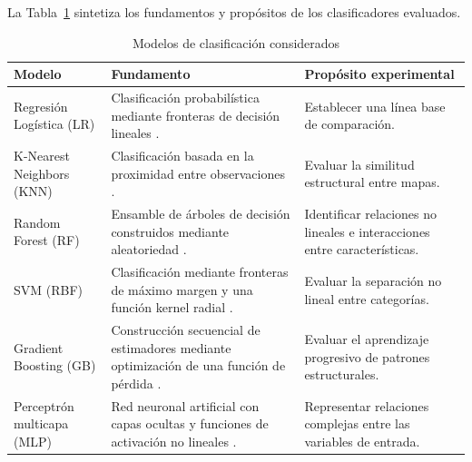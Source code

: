 La Tabla~\ref{tab:modelos_considerados} sintetiza los fundamentos y propósitos de los clasificadores evaluados.

\begin{table}[htbp]
	\centering
	
	\caption{Modelos de clasificación considerados}
	\label{tab:modelos_considerados}
	
	\renewcommand{\arraystretch}{1.3}
	\small
	
	\begin{tabularx}{\textwidth}{
			|>{\raggedright\arraybackslash}p{3cm}|
			>{\raggedright\arraybackslash}X|
			>{\raggedright\arraybackslash}X|
		}
		
		\hline
		
		\rowcolor{gray!15}
		\textbf{Modelo} &
		\textbf{Fundamento} &
		\textbf{Propósito experimental} \\ \hline
		
		Regresión Logística (LR) &
		Clasificación probabilística mediante
		fronteras de decisión lineales
		\parencite{james2023}. &
		Establecer una línea base de comparación.
		\\ \hline
		
		K-Nearest Neighbors (KNN) &
		Clasificación basada en la proximidad
		entre observaciones
		\parencite{cunningham2021}. &
		Evaluar la similitud estructural entre mapas.
		\\ \hline
		
		Random Forest (RF) &
		Ensamble de árboles de decisión
		construidos mediante aleatoriedad
		\parencite{breiman2001}. &
		Identificar relaciones no lineales e
		interacciones entre características.
		\\ \hline
		
		SVM (RBF) &
		Clasificación mediante fronteras de máximo
		margen y una función kernel radial
		\parencite{cortes1995}. &
		Evaluar la separación no lineal
		entre categorías.
		\\ \hline
		
		Gradient Boosting (GB) &
		Construcción secuencial de estimadores
		mediante optimización de una función
		de pérdida
		\parencite{friedman2001}. &
		Evaluar el aprendizaje progresivo
		de patrones estructurales.
		\\ \hline
		
		Perceptrón multicapa (MLP) &
		Red neuronal artificial con capas ocultas
		y funciones de activación no lineales
		\parencite{goodfellow2016}. &
		Representar relaciones complejas
		entre las variables de entrada.
		\\ \hline
		
	\end{tabularx}
	
\end{table}

